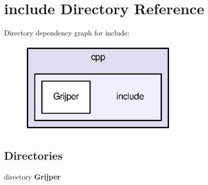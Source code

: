 \section{include Directory Reference}
\label{dir_c21fb3a7994e371ac1cbff92d428130d}
Directory dependency graph for include\-:\nopagebreak
\begin{figure}[H]
\begin{center}
\leavevmode
\includegraphics[width=218pt]{dir_c21fb3a7994e371ac1cbff92d428130d_dep}
\end{center}
\end{figure}
\subsection*{Directories}
\begin{DoxyCompactItemize}
\item 
directory {\bf Grijper}
\end{DoxyCompactItemize}
